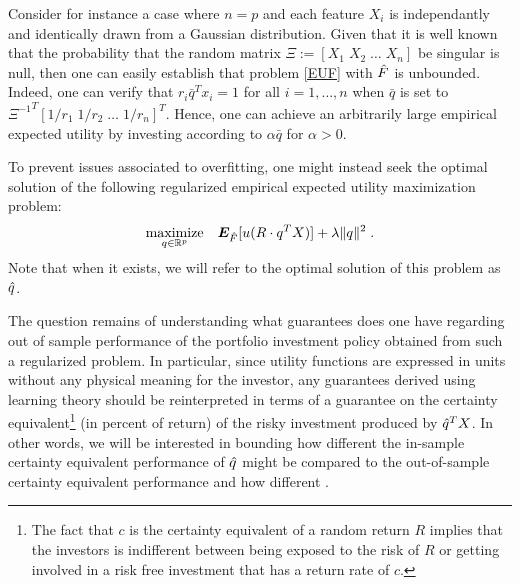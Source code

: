 \begin{ex}
  Consider for instance a case where $n=p$ and each feature $X_i$ is independantly and
  identically drawn from a Gaussian distribution. Given that it is well known that the
  probability that the random matrix $\Xi := [X_1\;X_2\;\dots\;X_n]$ be singular is null,
  then one can easily establish that problem \eqref{EUF} with ${\hat{F}}$ is
  unbounded. Indeed, one can verify that $r_i \bar{q}^T x_i = 1$ for all $i=1,\dots,n$
  when $\bar{q}$ is set to ${\Xi^{-1}}^T [1/r_1\;1/r_2\;\dots\;1/r_n]^T$. Hence, one can
  achieve an arbitrarily large empirical expected utility by investing according to
  $\alpha\bar{q}$ for $\alpha>0$.
\end{ex}

To prevent issues associated to overfitting, one might instead seek the optimal solution
of the following regularized empirical expected utility maximization problem:
\begin{equation}
\operatorname*{maximize}_{q\in\mathbb{R}^p}\;\;\;\bm E_{\hat{F}}[u(R\cdot q^TX)]+\lambda\|q\|^2\;.\label{EUFhatReg}
\end{equation}
Note that when it exists, we will refer to the optimal solution of this problem as ${\hat{q}}$.

The question remains of understanding what guarantees does one have regarding out of
sample performance of the portfolio investment policy obtained from such a regularized
problem. In particular, since utility functions are expressed in units without any
physical meaning for the investor, any guarantees derived using learning theory should be
reinterpreted in terms of a guarantee on the certainty equivalent\footnote{The fact that
  $c$ is the certainty equivalent of a random return $R$ implies that the investors is
  indifferent between being exposed to the risk of $R$ or getting involved in a risk free
  investment that has a return rate of $c$.} (in percent of return) of the risky
investment produced by ${\hat{q}}^T X$. In other words, we will be interested in bounding how
different the in-sample certainty equivalent performance of ${\hat{q}}$ might be compared to
the out-of-sample certainty equivalent performance and how different .







